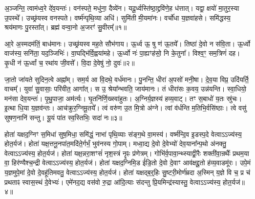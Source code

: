 \clearpage
{}
\setcounter{anuvakam}{0}

अ॒ञ्जन्ति॒ त्वाम॑ध्व॒रे दे॑व॒यन्तः॑।
वन॑स्पते॒ मधु॑ना॒ दैव्ये॑न।
यदू॒र्ध्वस्ति॑ष्ठा॒द्द्रवि॑णे॒ह ध॑त्तात्।
यद्वा॒ क्षयो॑ मा॒तुर॒स्या उ॒पस्थे᳚।
उच्छ्र॑यस्व वनस्पते।
वर्ष्म॑न्पृथि॒व्या अधि॑।
सुमि॑ती मी॒यमा॑नः।
वर्चो॑धा य॒ज्ञवा॑हसे।
समि॑द्धस्य॒ श्रय॑माणः पु॒रस्ता᳚त्।
ब्रह्म॑ वन्वा॒नो अ॒जरꣳ॑ सु॒वीरम्᳚॥१॥

आ॒रे अ॒स्मदम॑तिं॒ बाध॑मानः।
उच्छ्र॑यस्व मह॒ते सौभ॑गाय।
ऊ॒र्ध्व ऊ॒ षु ण॑ ऊ॒तये᳚।
तिष्ठा॑ दे॒वो न स॑वि॒ता।
ऊ॒र्ध्वो वाज॑स्य॒ सनि॑ता॒ यद॒ञ्जिभिः॑।
वा॒घद्भि॑र्वि॒ह्वया॑महे।
ऊ॒र्ध्वो नः॑ पा॒ह्यꣳह॑सो॒ नि के॒तुना᳚।
विश्व॒ꣳ॒ सम॒त्रिणं॑ दह।
कृ॒धी न॑ ऊ॒र्ध्वां च॒ रथा॑य जी॒वसे᳚।
वि॒दा दे॒वेषु॑ नो॒ दुवः॑॥२॥

जा॒तो जा॑यते सुदिन॒त्वे अह्ना᳚म्।
सम॒र्य आ वि॒दथे॒ वर्ध॑मानः।
पु॒नन्ति॒ धीरा॑ अ॒पसो॑ मनी॒षा।
दे॒व॒या विप्र॒ उदि॑यर्ति॒ वाचम्᳚।
युवा॑ सु॒वासाः॒ परि॑वीत॒ आगा᳚त्।
स उ॒ श्रेया᳚न्भवति॒ जाय॑मानः।
तं धीरा॑सः क॒वय॒ उन्न॑यन्ति।
स्वा॒धियो॒ मन॑सा देव॒यन्तः॑।
पृ॒थु॒पाजा॒ अम॑र्त्यः।
घृ॒तनि॑र्णि॒ख्स्वा॑हुतः।
अ॒ग्निर्य॒ज्ञस्य॑ हव्य॒वाट्।
तꣳ स॒बाधो॑ य॒तः स्रु॑चः।
इ॒त्था धि॒या य॒ज्ञव॑न्तः।
आच॑क्रुर॒ग्निमू॒तये᳚।
त्वं वरु॑ण उ॒त मि॒त्रो अ॑ग्ने।
त्वां व॑र्धन्ति म॒तिभि॒र्वसि॑ष्ठाः।
त्वे वसु॑ सुषण॒नानि॑ सन्तु।
यू॒यं पा॑त स्व॒स्तिभिः॒ सदा॑ नः॥३॥\anuvakamend[सु॒वीरं॒ दुवः॒ स्वा॑हुतो॒\-ऽष्टौ च॑]

होता॑ यक्षद॒ग्निꣳ स॒मिधा॑ सुष॒मिधा॒ समि॑द्धं॒ नाभा॑ पृथि॒व्याः स॑ङ्ग॒थे वा॒मस्य॑।
वर्ष्म॑न्दि॒व इ॒डस्प॒दे वेत्वा\-ऽ\-ऽ\-ज्य॑स्य॒ होत॒र्यज॑।
होता॑ यक्ष॒त्तनू॒नपा॑त॒मदि॑ते॒र्गर्भं॒ भुव॑नस्य गो॒पाम्।
मध्वा॒द्य दे॒वो दे॒वेभ्यो॑ देव॒याना᳚न्प॒थो अ॑नक्तु॒ वेत्वा\-ऽ\-ऽ\-ज्य॑स्य॒ होत॒र्यज॑।
होता॑ यक्ष॒न्नरा॒शꣳसं॑ नृश॒स्त्रं नॄꣴः प्र॑णेत्रम्।
गोभि॑र्व॒पावा॒न्थ्स्याद्वी॒रैः शक्ती॑वा॒न्रथैः᳚ प्रथम॒या वा॒ हिर॑ण्यैश्च॒न्द्री वेत्वा\-ऽ\-ऽ\-ज्य॑स्य॒ होत॒र्यज॑।
होता॑ यक्षद॒ग्निमि॒ड ई॑डि॒तो दे॒वो दे॒वाꣳ आव॑क्षद्दू॒तो ह॑व्य॒वाडमू॑रः।
उपे॒मं य॒ज्ञमुपे॒मां दे॒वो दे॒वहू॑तिमवतु॒ वेत्वा\-ऽ\-ऽ\-ज्य॑स्य॒ होत॒र्यज॑।
होता॑ यक्षद्ब॒र्‌॒\mbox{}हिः सु॒ष्टरी॒मोर्ण॑म्रदा अ॒स्मिन् य॒ज्ञे वि च॒ प्र च॑ प्रथताꣴ स्वास॒स्थं दे॒वेभ्यः॑।
एमे॑नद॒द्य वस॑वो रु॒द्रा आ॑दि॒त्याः स॑दन्तु प्रि॒यमिन्द्र॑स्यास्तु॒ वेत्वा\-ऽ\-ऽ\-ज्य॑स्य॒ होत॒र्यज॑॥४॥


